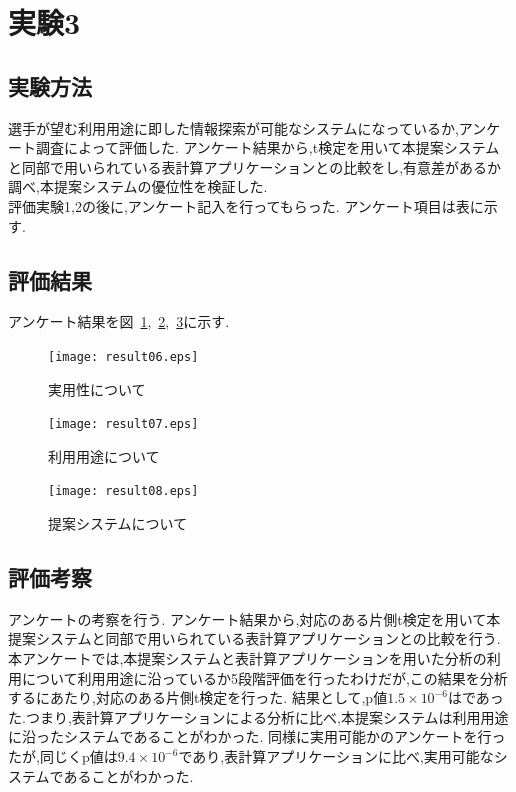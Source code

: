 \documentclass[sotsuron]{kuee}
\begin{document}
	\section{実験3}
		\subsection{実験方法}
			選手が望む利用用途に即した情報探索が可能なシステムになっているか,アンケート調査によって評価した.
			アンケート結果から,t検定を用いて本提案システムと同部で用いられている表計算アプリケーションとの比較をし,有意差があるか調べ,本提案システムの優位性を検証した.
			\\評価実験1,2の後に,アンケート記入を行ってもらった.
			アンケート項目は表に示す.
		\subsection{評価結果}
		アンケート結果を図~\ref{fig:result06},~\ref{fig:result07},~\ref{fig:result08}に示す.
			\begin{figure}
				\begin{center}
					\texttt{[image: result06.eps]}
				\end{center}
				\caption{実用性について}
		  		\label{fig:result06}
			\end{figure}
			\begin{figure}
				\begin{center}
					\texttt{[image: result07.eps]}
				\end{center}
				\caption{利用用途について}
		  		\label{fig:result07}
			\end{figure}
			\begin{figure}
				\begin{center}
					\texttt{[image: result08.eps]}
				\end{center}
				\caption{提案システムについて}
		  		\label{fig:result08}
			\end{figure}
		\subsection{評価考察}
			アンケートの考察を行う.
			アンケート結果から,対応のある片側t検定を用いて本提案システムと同部で用いられている表計算アプリケーションとの比較を行う.
			本アンケートでは,本提案システムと表計算アプリケーションを用いた分析の利用について利用用途に沿っているか5段階評価を行ったわけだが,この結果を分析するにあたり,対応のある片側t検定を行った.
			結果として,p値$1.5 \times 10^{-6}$はであった.つまり,表計算アプリケーションによる分析に比べ,本提案システムは利用用途に沿ったシステムであることがわかった.
			同様に実用可能かのアンケートを行ったが,同じくp値は$9.4 \times 10^{-6}$であり,表計算アプリケーションに比べ,実用可能なシステムであることがわかった.
\end{document}
